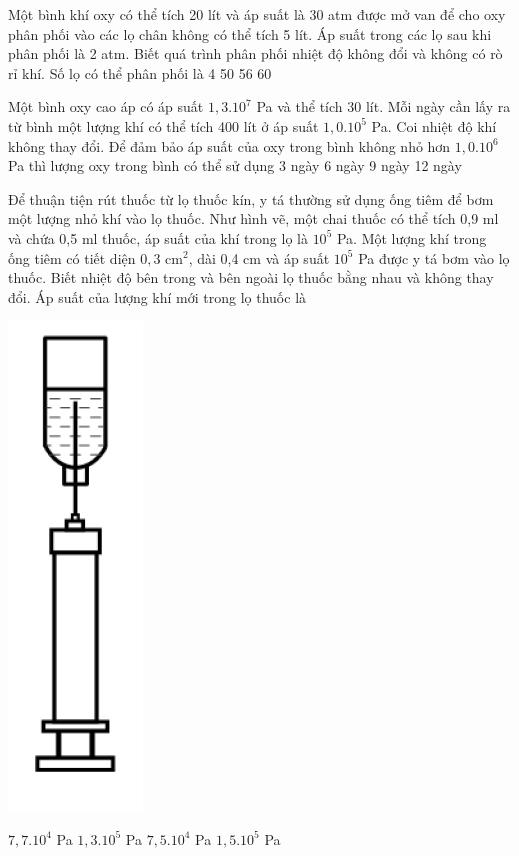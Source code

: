 \documentclass[12pt,a4paper]{article}
\begin{document}
\begin{ex}
	Một bình khí oxy có thể tích 20 lít và áp suất là 30 atm được mở van để cho oxy phân phối vào các lọ chân không có thể tích 5 lít. Áp suất trong các lọ sau khi phân phối là 2 atm. Biết quá trình phân phối nhiệt độ không đổi và không có rò rỉ khí. Số lọ có thể phân phối là
	\choice
	{4}
	{50}
	{56}
	{60}
\end{ex}

\begin{ex}
	Một bình oxy cao áp có áp suất $1,3.10^7$ Pa và thể tích 30 lít. Mỗi ngày cần lấy ra từ bình một lượng khí có thể tích 400 lít ở áp suất $1,0.10^5$ Pa. Coi nhiệt độ khí không thay đổi. Để đảm bảo áp suất của oxy trong bình không nhỏ hơn $1,0.10^6$ Pa thì lượng oxy trong bình có thể sử dụng
	\choice
	{3 ngày}
	{6 ngày}
	{9 ngày}
	{12 ngày}
\end{ex}

\begin{ex}
	Để thuận tiện rút thuốc từ lọ thuốc kín, y tá thường sử dụng ống tiêm để bơm một lượng nhỏ khí vào lọ thuốc. Như hình vẽ, một chai thuốc có thể tích 0,9 ml và chứa 0,5 ml thuốc, áp suất của khí trong lọ là $10^5$ Pa. Một lượng khí trong ống tiêm có tiết diện $0,3 \text{ cm}^2$, dài 0,4 cm và áp suất $10^5$ Pa được y tá bơm vào lọ thuốc. Biết nhiệt độ bên trong và bên ngoài lọ thuốc bằng nhau và không thay đổi. Áp suất của lượng khí mới trong lọ thuốc là
	\begin{center}
		\includegraphics[scale=0.3]{img/1.png}
	\end{center}
	\choice
	{$7,7.10^4$ Pa}
	{$1,3.10^5$ Pa}
	{$7,5.10^4$ Pa}
	{$1,5.10^5$ Pa}
\end{ex}
\end{document}
